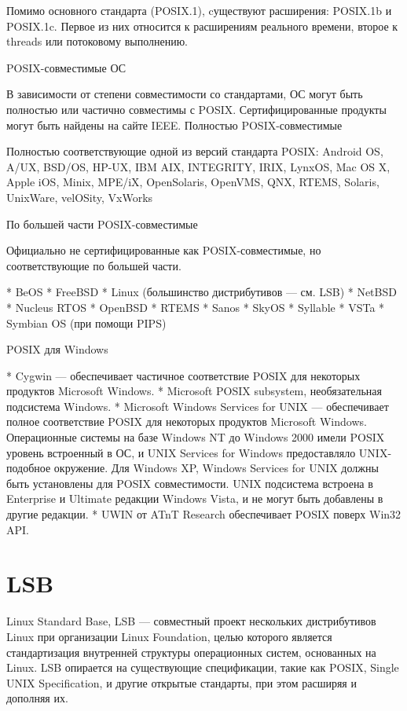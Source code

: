 Помимо основного стандарта (POSIX.1), cуществуют расширения: POSIX.1b и POSIX.1c. Первое из них относится к расширениям реального времени, второе к threads или потоковому выполнению.

POSIX-совместимые ОС

В зависимости от степени совместимости со стандартами, ОС могут быть полностью или частично совместимы с POSIX. Сертифицированные продукты могут быть найдены на сайте IEEE.
Полностью POSIX-совместимые

Полностью соответствующие одной из версий стандарта POSIX: Android OS, A/UX, BSD/OS, HP-UX, IBM AIX, INTEGRITY, IRIX, LynxOS, Mac OS X, Apple iOS, Minix, MPE/iX, OpenSolaris, OpenVMS, QNX, RTEMS, Solaris, UnixWare, velOSity, VxWorks

По большей части POSIX-совместимые

Официально не сертифицированные как POSIX-совместимые, но соответствующие по большей части.

    * BeOS
    * FreeBSD
    * Linux (большинство дистрибутивов — см. LSB)
    * NetBSD
    * Nucleus RTOS
    * OpenBSD
    * RTEMS
    * Sanos
    * SkyOS
    * Syllable
    * VSTa
    * Symbian OS (при помощи PIPS)

POSIX для Windows

    * Cygwin — обеспечивает частичное соответствие POSIX для некоторых продуктов Microsoft Windows.
    * Microsoft POSIX subsystem, необязательная подсистема Windows.
    * Microsoft Windows Services for UNIX — обеспечивает полное соответствие POSIX для некоторых продуктов Microsoft Windows. Операционные системы на базе Windows NT до Windows 2000 имели POSIX уровень встроенный в ОС, и UNIX Services for Windows предоставляло UNIX-подобное окружение. Для Windows XP, Windows Services for UNIX должны быть установлены для POSIX совместимости. UNIX подсистема встроена в Enterprise и Ultimate редакции Windows Vista, и не могут быть добавлены в другие редакции.
    * UWIN от ATnT Research обеспечивает POSIX поверх Win32 API.

\section{LSB}
Linux Standard Base, LSB — совместный проект нескольких дистрибутивов Linux при организации Linux Foundation, целью которого является стандартизация внутренней структуры операционных систем, основанных на Linux. LSB опирается на существующие спецификации, такие как POSIX, Single UNIX Specification, и другие открытые стандарты, при этом расширяя и дополняя их.

